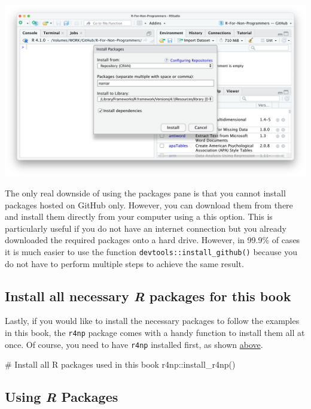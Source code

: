 \documentclass[
  letterpaper,
  DIV=11,
  numbers=noendperiod]{scrreprt}
\newenvironment{Shaded}{\begin{snugshade}}{\end{snugshade}}
\newcommand{\CommentTok}[1]{\textcolor[rgb]{0.37,0.37,0.37}{#1}}
\newcommand{\FunctionTok}[1]{\textcolor[rgb]{0.28,0.35,0.67}{#1}}
\newcommand{\NormalTok}[1]{\textcolor[rgb]{0.00,0.23,0.31}{#1}}
\newcommand{\SpecialCharTok}[1]{\textcolor[rgb]{0.37,0.37,0.37}{#1}}
\begin{document}
\begin{enumerate}
  \includegraphics{images/chapter_05_img/install_r_packages/03_install_r_packages.png}
\end{enumerate}

The only real downside of using the packages pane is that you cannot
install packages hosted on GitHub only. However, you can download them
from there and install them directly from your computer using a this
option. This is particularly useful if you do not have an internet
connection but you already downloaded the required packages onto a hard
drive. However, in 99.9\% of cases it is much easier to use the function
\texttt{devtools::install\_github()} because you do not have to perform
multiple steps to achieve the same result.

\subsection{\texorpdfstring{Install all necessary \emph{R} packages for
this
book}{Install all necessary R packages for this book}}\label{sec-install-all-r-packages}

Lastly, if you would like to install the necessary packages to follow
the examples in this book, the \texttt{r4np} package comes with a handy
function to install them all at once. Of course, you need to have
\texttt{r4np} installed first, as shown \hyperref[install-r4np]{above}.

\begin{Shaded}
\begin{Highlighting}[]
\CommentTok{\# Install all R packages used in this book}
\NormalTok{r4np}\SpecialCharTok{::}\FunctionTok{install\_r4np}\NormalTok{()}
\end{Highlighting}
\end{Shaded}

\subsection{\texorpdfstring{Using \emph{R}
Packages}{Using R Packages}}\label{sec-using-r-packages}
\end{document}
